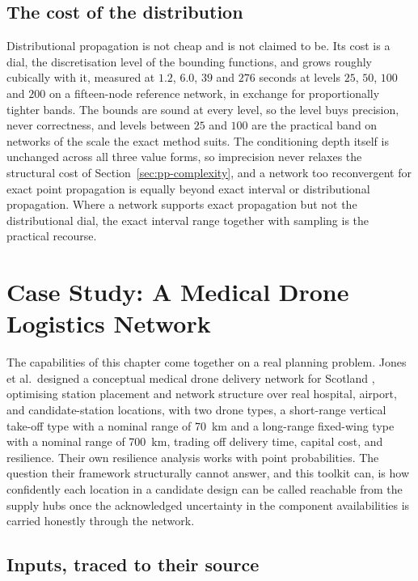 \documentclass[12pt]{report}
\begin{document}
\subsection{The cost of the distribution}
\label{sec:pp-pbox-cost}

Distributional propagation is not cheap and is not claimed to be. Its cost is a dial, the discretisation level of the bounding functions, and grows roughly cubically with it, measured at $1.2$, $6.0$, $39$ and $276$ seconds at levels $25$, $50$, $100$ and $200$ on a fifteen-node reference network, in exchange for proportionally tighter bands. The bounds are sound at every level, so the level buys precision, never correctness, and levels between $25$ and $100$ are the practical band on networks of the scale the exact method suits. The conditioning depth itself is unchanged across all three value forms, so imprecision never relaxes the structural cost of Section~\ref{sec:pp-complexity}, and a network too reconvergent for exact point propagation is equally beyond exact interval or distributional propagation. Where a network supports exact propagation but not the distributional dial, the exact interval range together with sampling is the practical recourse.

\section{Case Study: A Medical Drone Logistics Network}
\label{sec:pp-case}

The capabilities of this chapter come together on a real planning problem. Jones et al.\ designed a conceptual medical drone delivery network for Scotland \cite{jones2025conceptual}, optimising station placement and network structure over real hospital, airport, and candidate-station locations, with two drone types, a short-range vertical take-off type with a nominal range of 70~km and a long-range fixed-wing type with a nominal range of 700~km, trading off delivery time, capital cost, and resilience. Their own resilience analysis works with point probabilities. The question their framework structurally cannot answer, and this toolkit can, is how confidently each location in a candidate design can be called reachable from the supply hubs once the acknowledged uncertainty in the component availabilities is carried honestly through the network.

\subsection{Inputs, traced to their source}
\label{sec:pp-case-inputs}
\end{document}
